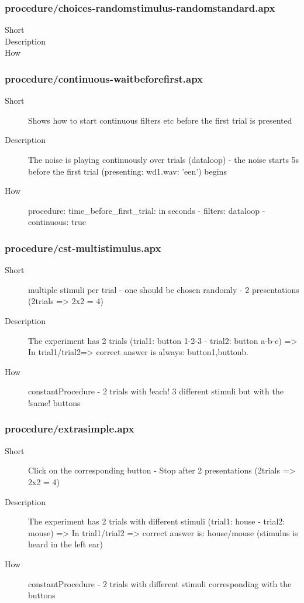 \subsubsection{procedure/choices-randomstimulus-randomstandard.apx}
\begin{description}
\item[Short] 
\item[Description] 
\item[How] 
\end{description}

\subsubsection{procedure/continuous-waitbeforefirst.apx}
\begin{description}
\item[Short] 
 Shows how to start continuous filters etc before the first trial is presented
\item[Description] 
 The noise is playing continuously over trials (dataloop)  - the noise starts 5s before the first trial (presenting: wd1.wav: 'een') begins
\item[How] 
 procedure: time\_before\_first\_trial: in seconds - filters: dataloop - continuous: true
\end{description}

\subsubsection{procedure/cst-multistimulus.apx}
\begin{description}
\item[Short] 
 multiple stimuli per trial - one should be chosen randomly - 2 presentations (2trials =\textgreater{} 2x2 = 4)
\item[Description] 
 The experiment has 2 trials (trial1: button 1-2-3 - trial2: button a-b-c) =\textgreater{} In trial1/trial2=\textgreater{} correct answer is always: button1,buttonb.
\item[How] 
 constantProcedure - 2 trials with !each! 3 different stimuli but with the !same! buttons
\end{description}

\subsubsection{procedure/extrasimple.apx}
\begin{description}
\item[Short] 
 Click on the corresponding button - Stop after 2 presentations (2trials =\textgreater{} 2x2 = 4)
\item[Description] 
 The experiment has 2 trials with different stimuli (trial1: house - trial2: mouse) =\textgreater{} In trial1/trial2 =\textgreater{} correct answer is: house/mouse (stimulus is heard in the left ear)
\item[How] 
 constantProcedure - 2 trials with different stimuli corresponding with the buttons
\end{description}

